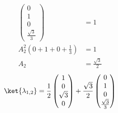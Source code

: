 \documentclass{article}
\begin{document}
\begin{enumerate}
\begin{equation}
\begin{split}
				\begin{pmatrix}
					0 \\
					1 \\
					0 \\
					\frac{\sqrt{3}}{3}
				\end{pmatrix} &= 1 \\
				A_2^2 \left( 0 + 1 + 0 + \frac{1}{3} \right) &= 1 \\
				A_2 &= \frac{\sqrt{3}}{2}
			\end{split}
		\end{equation}
		\begin{equation}
			\ket{\lambda_{1,2}} = \frac{1}{2}
			\begin{pmatrix}
				1 \\
				0 \\
				\sqrt{3} \\
				0
			\end{pmatrix} + \frac{\sqrt{3}}{2} \begin{pmatrix}
				0 \\
				1 \\
				0 \\
				\frac{\sqrt{3}}{3}
			\end{pmatrix}
		\end{equation}
		

\end{enumerate}
\end{document}

